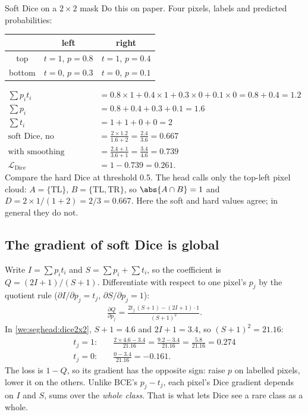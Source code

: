 \begin{worked}[label={we:seghead:dice2x2}]{Soft Dice on a $2 \times 2$ mask}
Do this on paper. Four pixels, labels and predicted probabilities:
\begin{center}
\begin{tabular}{c|cc}
& left & right\\
\midrule
top & $t = 1$, $p = 0.8$ & $t = 1$, $p = 0.4$\\
bottom & $t = 0$, $p = 0.3$ & $t = 0$, $p = 0.1$\\
\end{tabular}
\end{center}
\begin{align*}
  \textstyle\sum p_i t_i &= 0.8 \times 1 + 0.4 \times 1 + 0.3 \times 0 + 0.1 \times 0 = 0.8 + 0.4 = 1.2\\
  \textstyle\sum p_i &= 0.8 + 0.4 + 0.3 + 0.1 = 1.6\\
  \textstyle\sum t_i &= 1 + 1 + 0 + 0 = 2\\
  \text{soft Dice, no smoothing} &= \frac{2 \times 1.2}{1.6 + 2} = \frac{2.4}{3.6} = 0.667\\
  \text{with smoothing} &= \frac{2.4 + 1}{3.6 + 1} = \frac{3.4}{4.6} = 0.739\\
  \mathcal{L}_{\text{Dice}} &= 1 - 0.739 = 0.261.
\end{align*}
Compare the hard Dice at threshold 0.5. The head calls only the top-left pixel cloud: $A = \{\text{TL}\}$, $B = \{\text{TL}, \text{TR}\}$,
so $\abs{A \cap B} = 1$ and $D = 2 \times 1 / (1 + 2) = 2/3 = 0.667$. Here the soft and hard values agree; in general they do not.
\end{worked}

\subsection{The gradient of soft Dice is global}

Write $I = \sum p_i t_i$ and $S = \sum p_i + \sum t_i$, so the coefficient is $Q = (2I + 1)/(S + 1)$. Differentiate with respect to one
pixel's $p_j$ by the quotient rule ($\partial I/\partial p_j = t_j$, $\partial S / \partial p_j = 1$):
\begin{align*}
  \frac{\partial Q}{\partial p_j} = \frac{2t_j\,(S + 1) - (2I + 1)\cdot 1}{(S + 1)^2}.
\end{align*}
In \cref{we:seghead:dice2x2}, $S + 1 = 4.6$ and $2I + 1 = 3.4$, so $(S+1)^2 = 21.16$:
\begin{align*}
  t_j = 1:&\quad \frac{2 \times 4.6 - 3.4}{21.16} = \frac{9.2 - 3.4}{21.16} = \frac{5.8}{21.16} = 0.274\\
  t_j = 0:&\quad \frac{0 - 3.4}{21.16} = -0.161.
\end{align*}
The loss is $1 - Q$, so its gradient has the opposite sign: raise $p$ on labelled pixels, lower it on the others. Unlike BCE's $p_j - t_j$,
each pixel's Dice gradient depends on $I$ and $S$, sums over the \emph{whole class}. That is what lets Dice see a rare class as a whole.

